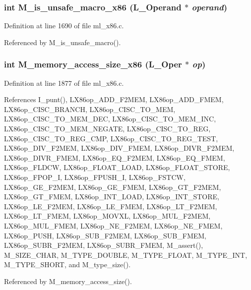 \subsubsection{\setlength{\rightskip}{0pt plus 5cm}int M\_\-is\_\-unsafe\_\-macro\_\-x86 (L\_\-Operand $\ast$ {\em operand})}\label{m__x86_8h_9815a77f31bd8e5ee3ecaa306475f253}




Definition at line 1690 of file ml\_\-x86.c.

Referenced by M\_\-is\_\-unsafe\_\-macro().
\subsubsection{\setlength{\rightskip}{0pt plus 5cm}int M\_\-memory\_\-access\_\-size\_\-x86 (L\_\-Oper $\ast$ {\em op})}\label{m__x86_8h_cf2c95365ea5d4189a6c38b338142be9}




Definition at line 1877 of file ml\_\-x86.c.

References I\_\-punt(), LX86op\_\-ADD\_\-F2MEM, LX86op\_\-ADD\_\-FMEM, LX86op\_\-CISC\_\-BRANCH, LX86op\_\-CISC\_\-TO\_\-MEM, LX86op\_\-CISC\_\-TO\_\-MEM\_\-DEC, LX86op\_\-CISC\_\-TO\_\-MEM\_\-INC, LX86op\_\-CISC\_\-TO\_\-MEM\_\-NEGATE, LX86op\_\-CISC\_\-TO\_\-REG, LX86op\_\-CISC\_\-TO\_\-REG\_\-CMP, LX86op\_\-CISC\_\-TO\_\-REG\_\-TEST, LX86op\_\-DIV\_\-F2MEM, LX86op\_\-DIV\_\-FMEM, LX86op\_\-DIVR\_\-F2MEM, LX86op\_\-DIVR\_\-FMEM, LX86op\_\-EQ\_\-F2MEM, LX86op\_\-EQ\_\-FMEM, LX86op\_\-FLDCW, LX86op\_\-FLOAT\_\-LOAD, LX86op\_\-FLOAT\_\-STORE, LX86op\_\-FPOP\_\-I, LX86op\_\-FPUSH\_\-I, LX86op\_\-FSTCW, LX86op\_\-GE\_\-F2MEM, LX86op\_\-GE\_\-FMEM, LX86op\_\-GT\_\-F2MEM, LX86op\_\-GT\_\-FMEM, LX86op\_\-INT\_\-LOAD, LX86op\_\-INT\_\-STORE, LX86op\_\-LE\_\-F2MEM, LX86op\_\-LE\_\-FMEM, LX86op\_\-LT\_\-F2MEM, LX86op\_\-LT\_\-FMEM, LX86op\_\-MOVXL, LX86op\_\-MUL\_\-F2MEM, LX86op\_\-MUL\_\-FMEM, LX86op\_\-NE\_\-F2MEM, LX86op\_\-NE\_\-FMEM, LX86op\_\-PUSH, LX86op\_\-SUB\_\-F2MEM, LX86op\_\-SUB\_\-FMEM, LX86op\_\-SUBR\_\-F2MEM, LX86op\_\-SUBR\_\-FMEM, M\_\-assert(), M\_\-SIZE\_\-CHAR, M\_\-TYPE\_\-DOUBLE, M\_\-TYPE\_\-FLOAT, M\_\-TYPE\_\-INT, M\_\-TYPE\_\-SHORT, and M\_\-type\_\-size().

Referenced by M\_\-memory\_\-access\_\-size().

